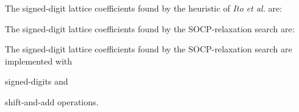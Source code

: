 \documentclass[a4paper,twoside,10pt,english]{report}
\begin{document}
The signed-digit lattice coefficients found by the heuristic of
\emph{Ito et al.} are:
\begin{small}


\end{small}

The signed-digit lattice coefficients found by the SOCP-relaxation search are:
\begin{small}


\end{small}
The signed-digit lattice coefficients found by the SOCP-relaxation search are
implemented with 

signed-digits and 

shift-and-add operations.
\end{document}
